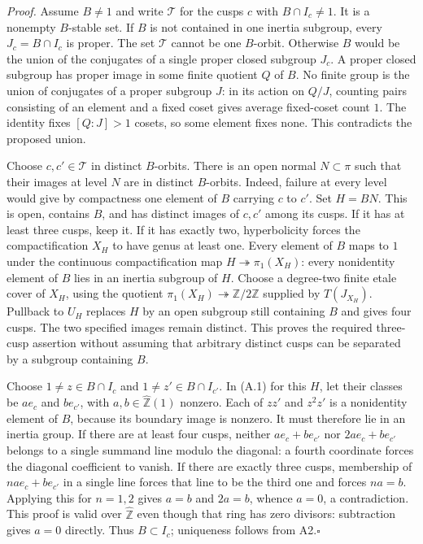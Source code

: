 \emph{Proof.} Assume $B\ne1$ and write $\mathcal T$ for the cusps $c$ with $B\cap I_c\ne1$. It is a nonempty $B$-stable set. If $B$ is not contained in one inertia subgroup, every $J_c=B\cap I_c$ is proper. The set $\mathcal T$ cannot be one $B$-orbit. Otherwise $B$ would be the union of the conjugates of a single proper closed subgroup $J_c$. A proper closed subgroup has proper image in some finite quotient $Q$ of $B$. No finite group is the union of conjugates of a proper subgroup $J$: in its action on $Q/J$, counting pairs consisting of an element and a fixed coset gives average fixed-coset count $1$. The identity fixes $[Q:J]>1$ cosets, so some element fixes none. This contradicts the proposed union.

Choose $c,c'\in\mathcal T$ in distinct $B$-orbits. There is an open normal $N\subset\pi$ such that their images at level $N$ are in distinct $B$-orbits. Indeed, failure at every level would give by compactness one element of $B$ carrying $c$ to $c'$. Set $H=BN$. This is open, contains $B$, and has distinct images of $c,c'$ among its cusps. If it has at least three cusps, keep it. If it has exactly two, hyperbolicity forces the compactification $X_H$ to have genus at least one. Every element of $B$ maps to $1$ under the continuous compactification map $H\twoheadrightarrow\pi_1(X_H)$: every nonidentity element of $B$ lies in an inertia subgroup of $H$. Choose a degree-two finite etale cover of $X_H$, using the quotient $\pi_1(X_H)\twoheadrightarrow\mathbb Z/2\mathbb Z$ supplied by $T(J_{X_H})$. Pullback to $U_H$ replaces $H$ by an open subgroup still containing $B$ and gives four cusps. The two specified images remain distinct. This proves the required three-cusp assertion without assuming that arbitrary distinct cusps can be separated by a subgroup containing $B$.

Choose $1\ne z\in B\cap I_c$ and $1\ne z'\in B\cap I_{c'}$. In (A.1) for this $H$, let their classes be $a e_c$ and $b e_{c'}$, with $a,b\in\widehat{\mathbb Z}(1)$ nonzero. Each of $zz'$ and $z^2z'$ is a nonidentity element of $B$, because its boundary image is nonzero. It must therefore lie in an inertia group. If there are at least four cusps, neither $a e_c+b e_{c'}$ nor $2a e_c+b e_{c'}$ belongs to a single summand line modulo the diagonal: a fourth coordinate forces the diagonal coefficient to vanish. If there are exactly three cusps, membership of $n a e_c+b e_{c'}$ in a single line forces that line to be the third one and forces $na=b$. Applying this for $n=1,2$ gives $a=b$ and $2a=b$, whence $a=0$, a contradiction. This proof is valid over $\widehat{\mathbb Z}$ even though that ring has zero divisors: subtraction gives $a=0$ directly. Thus $B\subset I_c$; uniqueness follows from A2.\hfill$\square$

